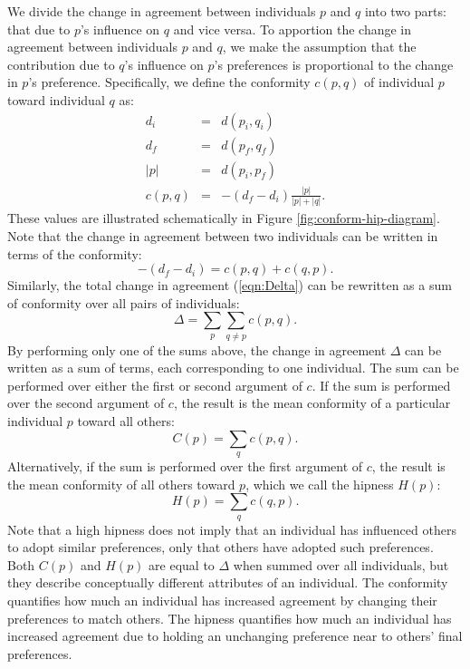 We divide the change in agreement between individuals $p$ and $q$ into two parts:
that due to $p$'s influence on $q$ and vice versa. 
To apportion the change in agreement between individuals $p$ and $q$,
we make the assumption that the contribution due to $q$'s influence on $p$'s preferences is
proportional to the change in $p$'s preference.
Specifically, we define the conformity $c(p,q)$ of individual $p$ toward individual $q$ as:
\begin{eqnarray}
    d_i &=& d(p_i, q_i) \\
    d_f &=& d(p_f, q_f) \\
    |p| &=& d(p_i, p_f) \\
    c(p,q) &=& -(d_f - d_i)\frac{|p|}{|p| + |q|}.
\end{eqnarray}
These values are illustrated schematically in Figure \ref{fig:conform-hip-diagram}.
Note that the change in agreement between two individuals can be written in terms of the conformity:
\begin{equation}
    -(d_f - d_i) = c(p, q) + c(q, p).
\end{equation}
Similarly, the total change in agreement (\ref{eqn:Delta}) can be rewritten as a sum of conformity over all pairs of individuals:
\begin{equation}
    \Delta =
    \sum_p \sum_{q \neq p} c(p, q).
\end{equation}
By performing only one of the sums above, the change in agreement $\Delta$ can be written as a sum of terms, each corresponding to one individual.
The sum can be performed over either the first or second argument of $c$.
If the sum is performed over the second argument of $c$, the result is the mean conformity of a particular individual $p$ toward all others:
\begin{equation}
    C(p) = \sum_q c(p, q).
\end{equation}
Alternatively, if the sum is performed over the first argument of $c$, the result is the mean conformity of all others toward $p$, which we call the hipness $H(p)$:
\begin{equation}
    H(p) = \sum_q c(q, p).
\end{equation}
Note that a high hipness does not imply that an individual has influenced others to adopt similar preferences,
only that others have adopted such preferences.
Both $C(p)$ and $H(p)$ are equal to $\Delta$ when summed over all individuals, but they describe conceptually different attributes of an individual.
The conformity quantifies how much an individual has increased agreement by changing their preferences to match others.
The hipness quantifies how much an individual has increased agreement due to holding an unchanging preference near to others' final preferences.

